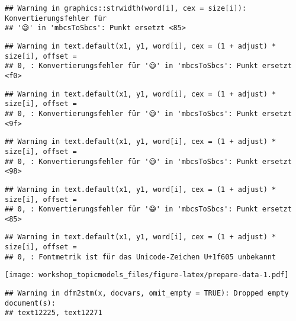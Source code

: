 \documentclass[
]{book}
\newenvironment{Shaded}{\begin{snugshade}}{\end{snugshade}}
\newcommand{\CommentTok}[1]{\textcolor[rgb]{0.56,0.35,0.01}{\textit{#1}}}
\newcommand{\DataTypeTok}[1]{\textcolor[rgb]{0.13,0.29,0.53}{#1}}
\newcommand{\KeywordTok}[1]{\textcolor[rgb]{0.13,0.29,0.53}{\textbf{#1}}}
\newcommand{\NormalTok}[1]{#1}
\newcommand{\OperatorTok}[1]{\textcolor[rgb]{0.81,0.36,0.00}{\textbf{#1}}}
\newcommand{\StringTok}[1]{\textcolor[rgb]{0.31,0.60,0.02}{#1}}
\begin{document}
\begin{verbatim}
## Warning in graphics::strwidth(word[i], cex = size[i]): Konvertierungsfehler für
## '😅' in 'mbcsToSbcs': Punkt ersetzt <85>
\end{verbatim}

\begin{verbatim}
## Warning in text.default(x1, y1, word[i], cex = (1 + adjust) * size[i], offset =
## 0, : Konvertierungsfehler für '😅' in 'mbcsToSbcs': Punkt ersetzt <f0>
\end{verbatim}

\begin{verbatim}
## Warning in text.default(x1, y1, word[i], cex = (1 + adjust) * size[i], offset =
## 0, : Konvertierungsfehler für '😅' in 'mbcsToSbcs': Punkt ersetzt <9f>
\end{verbatim}

\begin{verbatim}
## Warning in text.default(x1, y1, word[i], cex = (1 + adjust) * size[i], offset =
## 0, : Konvertierungsfehler für '😅' in 'mbcsToSbcs': Punkt ersetzt <98>
\end{verbatim}

\begin{verbatim}
## Warning in text.default(x1, y1, word[i], cex = (1 + adjust) * size[i], offset =
## 0, : Konvertierungsfehler für '😅' in 'mbcsToSbcs': Punkt ersetzt <85>
\end{verbatim}

\begin{verbatim}
## Warning in text.default(x1, y1, word[i], cex = (1 + adjust) * size[i], offset =
## 0, : Fontmetrik ist für das Unicode-Zeichen U+1f605 unbekannt
\end{verbatim}

\texttt{[image: workshop\_topicmodels\_files/figure-latex/prepare-data-1.pdf]}

\begin{Shaded}
\end{Shaded}

\begin{verbatim}
## Warning in dfm2stm(x, docvars, omit_empty = TRUE): Dropped empty document(s):
## text12225, text12271
\end{verbatim}
\end{document}
